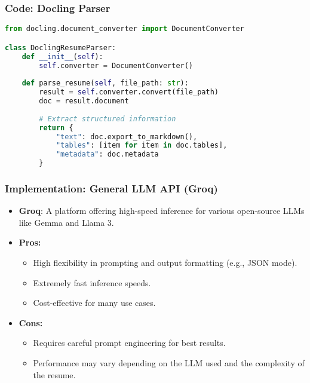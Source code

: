 \begin{frame}[fragile]\frametitle{Code: Docling Parser}
    \begin{lstlisting}[language=Python, basicstyle=\tiny, caption={llm\_parsing\_docling.py}]
from docling.document_converter import DocumentConverter

class DoclingResumeParser:
    def __init__(self):
        self.converter = DocumentConverter()
    
    def parse_resume(self, file_path: str):
        result = self.converter.convert(file_path)
        doc = result.document
        
        # Extract structured information
        return {
            "text": doc.export_to_markdown(),
            "tables": [item for item in doc.tables],
            "metadata": doc.metadata
        }
    \end{lstlisting}
\end{frame}

\begin{frame}[fragile]\frametitle{Implementation: General LLM API (Groq)}
    \begin{itemize}
        \item \textbf{Groq}: A platform offering high-speed inference for various open-source LLMs like Gemma and Llama 3.
        \item \textbf{Pros:}
        \begin{itemize}
            \item High flexibility in prompting and output formatting (e.g., JSON mode).
            \item Extremely fast inference speeds.
            \item Cost-effective for many use cases.
        \end{itemize}
        \item \textbf{Cons:}
        \begin{itemize}
            \item Requires careful prompt engineering for best results.
            \item Performance may vary depending on the LLM used and the complexity of the resume.
        \end{itemize}
    \end{itemize}
\end{frame}


